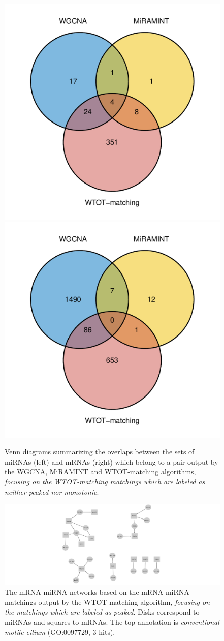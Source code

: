 \begin{figure}
  \centering
  \includegraphics[width=.45\textwidth]{images/miRNA_striatum_nopeak_nomonot.pdf}
  \includegraphics[width=.45\textwidth]{images/mRNA_striatum_nopeak_nomonot.pdf}
  \caption{Venn diagrams summarizing  the overlaps between the  sets of miRNAs
    (left)  and mRNAs  (right) which  belong to  a pair  output by  the WGCNA,
    MiRAMINT   and   WTOT-matching   algorithms,   \textit{focusing   on   the
      WTOT-matching  matchings  which  are   labeled  as  neither  peaked  nor
      monotonic}.}
  \label{fig:venn:others}
\end{figure}

\begin{figure}
  \centering
  \includegraphics[width=.9\textwidth]{images/networks_striatum_peak.png}
  \caption{The mRNA-miRNA networks based on the mRNA-miRNA matchings output by
    the WTOT-matching  algorithm, \textit{focusing on the  matchings which are
      labeled as  peaked}.  Disks correspond  to miRNAs and squares  to mRNAs.
    The top
    \label{fig:network:peaked}
    annotation is \textit{conventional motile cilium} (GO:0097729, 3 hits).}
\end{figure}


